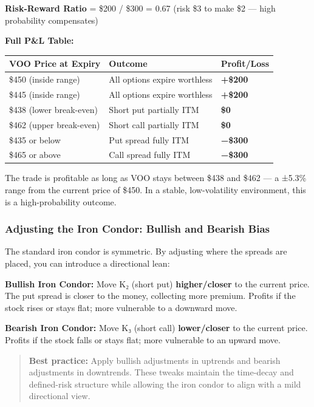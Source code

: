 \documentclass[12pt,openany]{book}
\begin{document}
\textbf{Risk-Reward Ratio} = \$200 / \$300 = 0.67 (risk \$3 to make \$2 — high probability compensates)

\textbf{Full P\&L Table:}

\begin{center}
\scriptsize
\setlength{\tabcolsep}{3pt}
\begin{tabular}{|L{4.42cm}|L{4.42cm}|L{4.42cm}|}
\hline
VOO Price at Expiry & Outcome & Profit/Loss \\
\hline
\$450 (inside range) & All options expire worthless & \textbf{+\$200} \\
\hline
\$445 (inside range) & All options expire worthless & \textbf{+\$200} \\
\hline
\$438 (lower break-even) & Short put partially ITM & \textbf{\$0} \\
\hline
\$462 (upper break-even) & Short call partially ITM & \textbf{\$0} \\
\hline
\$435 or below & Put spread fully ITM & \textbf{−\$300} \\
\hline
\$465 or above & Call spread fully ITM & \textbf{−\$300} \\
\hline
\end{tabular}
\end{center}

The trade is profitable as long as VOO stays between \$438 and \$462 — a ±5.3\% range from the current price of \$450. In a stable, low-volatility environment, this is a high-probability outcome.



\subsubsection{Adjusting the Iron Condor: Bullish and Bearish Bias}

The standard iron condor is symmetric. By adjusting where the spreads are placed, you can introduce a directional lean:

\textbf{Bullish Iron Condor:} Move K₂ (short put) \textbf{higher/closer} to the current price. The put spread is closer to the money, collecting more premium. Profits if the stock rises or stays flat; more vulnerable to a downward move.

\textbf{Bearish Iron Condor:} Move K₃ (short call) \textbf{lower/closer} to the current price. Profits if the stock falls or stays flat; more vulnerable to an upward move.

\begin{quote}
\textbf{Best practice:} Apply bullish adjustments in uptrends and bearish adjustments in downtrends. These tweaks maintain the time-decay and defined-risk structure while allowing the iron condor to align with a mild directional view.
\end{quote}
\end{document}
